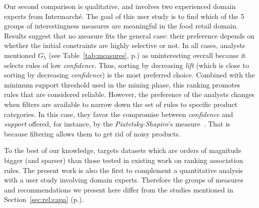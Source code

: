 Our second comparison is qualitative, and involves two experienced domain experts from Intermarch\'e.
The goal of this user study is to find which of the 5 groups of interestingness measures
are meaningful in the food retail domain.
Results suggest that no measure fits the general case:
their preference depends on whether the initial constraints are highly selective or not.
In all cases, analysts mentioned $G_5$ (see Table~\ref{tab:measures}, p.\pageref{tab:measures})
as uninteresting overall because it selects rules of low {\em confidence}.
Thus, sorting by decreasing {\em lift}
(which is close to sorting by decreasing {\em confidence})
is the most preferred choice.
Combined with the minimum support threshold used in the mining phase, this ranking promotes rules that are considered reliable.
However, the preference of the analysts changes when filters are available to narrow down the set of rules to specific product categories.
In this case, they favor the compromise between {\em confidence} and {\em support} offered,
for instance, by the {\em Piatetsky-Shapiro}'s measure~\cite{PiatetskyKDD91}.
That is because filtering allows them to get rid of noisy products.


To the best of our knowledge, \capa targets datasets which are orders of magnitude bigger (and sparser)
than those tested in existing work on ranking association rules.
The present work is also the first to complement a quantitative analysis
with a user study involving domain experts.
Therefore the groups of measures and recommendations we present here differ from the studies mentioned in
Section~\ref{sec:rel:capa} (p.\pageref{sec:rel:capa}).

